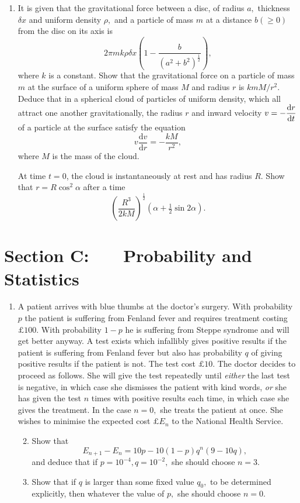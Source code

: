 \documentclass[a4, 11pt]{report}
\newlength{\qspace}
\newcounter{qnumber}
\newenvironment{question}%
 {\vspace{\qspace}
  \begin{enumerate}[\bfseries 1\quad][10]%
    \setcounter{enumi}{\value{qnumber}}%
    \item%
 }
{
  \end{enumerate}
  \filbreak
  \stepcounter{qnumber}
 }
\newenvironment{questionparts}[1][1]%
 {
  \begin{enumerate}[\bfseries (i)]%
    \setcounter{enumii}{#1}
    \addtocounter{enumii}{-1}
    \setlength{\itemsep}{5mm}
    \setlength{\parskip}{8pt}
 }
 {
  \end{enumerate}
 }
\def\d{{\rm d}}
\begin{document}
\begin{question}
It is given that the gravitational force between a disc, of radius
$a,$ thickness $\delta x$ and uniform density $\rho,$ and a particle
of mass $m$ at a distance $b(\geqslant0)$ from the disc on its axis
is 
\[
2\pi mk\rho\delta x\left(1-\frac{b}{(a^{2}+b^{2})^{\frac{1}{2}}}\right),
\]
where $k$ is a constant. Show that the gravitational force on a particle
of mass $m$ at the surface of a uniform sphere of mass $M$ and radius
$r$ is $kmM/r^{2}.$ Deduce that in a spherical cloud of particles
of uniform density, which all attract one another gravitationally,
the radius $r$ and inward velocity $v=-\dfrac{\d r}{\d t}$
of a particle at the surface satisfy the equation 
\[
v\frac{\mathrm{d}v}{\mathrm{d}r}=-\frac{kM}{r^{2}},
\]
where $M$ is the mass of the cloud. 


At time $t=0$, the cloud is instantaneously at rest and has radius
$R$. Show that $r=R\cos^{2}\alpha$ after a time 
\[
\left(\frac{R^{3}}{2kM}\right)^{\frac{1}{2}}(\alpha+\tfrac{1}{2}\sin2\alpha).
\]
\end{question}
	
	\newpage
\section*{Section C: \ \ \ Probability and Statistics}


\begin{question}
A patient arrives with blue thumbs at the doctor's surgery. With probability
$p$ the patient is suffering from Fenland fever and requires treatment
costing $\pounds 100.$ With probability $1-p$ he is suffering from
Steppe syndrome and will get better anyway. A test exists which infallibly
gives positive results if the patient is suffering from Fenland fever
but also has probability $q$ of giving positive results if the patient
is not. The test cost $\pounds 10.$ The doctor decides to proceed
as follows. She will give the test repeatedly until \textit{either
}the last test is negative, in which case she dismisses the patient
with kind words, \textit{or }she has given the test $n$ times with
positive results each time, in which case she gives the treatment.
In the case $n=0,$ she treats the patient at once. She wishes to
minimise the expected cost $\pounds E_{n}$ to the National Health
Service. \begin{questionparts}
\item Show that 
\[
E_{n+1}-E_{n}=10p-10(1-p)q^{n}(9-10q),
\]
and deduce that if $p=10^{-4},q=10^{-2},$ she should choose $n=3.$ 
\item Show that if $q$ is larger than some fixed value $q_{0},$ to be
determined explicitly, then whatever the value of $p,$ she should
choose $n=0.$ 
\end{questionparts}
\end{question}
\end{document}
